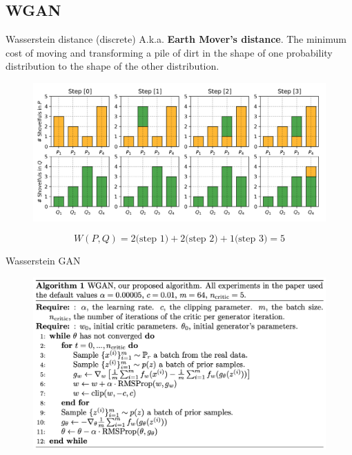 \subsection{WGAN}
\begin{frame}{Wasserstein distance (discrete)}
	A.k.a. \textbf{Earth Mover's distance}.
	The minimum cost of moving and transforming a pile of dirt in the shape of one probability distribution to the shape of the other distribution.
	\begin{figure}
		\centering
		\includegraphics[width=.9\linewidth]{figs/EM_distance_discrete}
	\end{figure}
	\[
		W(P, Q) = 2 \text{(step 1)} + 2 \text{(step 2)} + 1 \text{(step 3)}  = 5
	\]
\end{frame}
\begin{frame}{Wasserstein GAN}
	\begin{figure}
		\centering
		\includegraphics[width=1.0\linewidth]{figs/wgan_pseudocode}
	\end{figure}

\end{frame}
